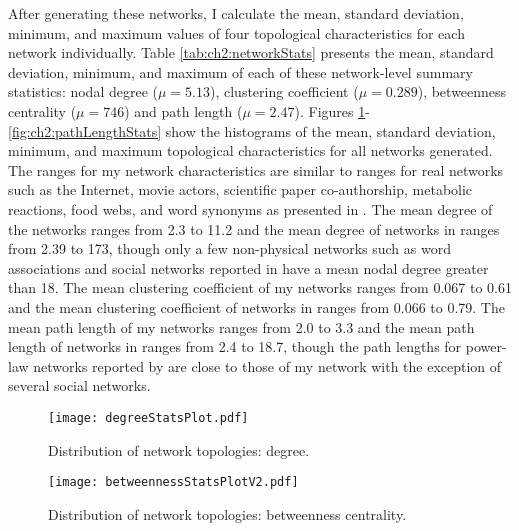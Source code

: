 After generating these networks, I calculate the mean, standard deviation, minimum, and maximum values of four topological characteristics for each network individually.  Table \ref{tab:ch2:networkStats} presents the mean, standard deviation, minimum, and maximum of each of these network-level summary statistics: nodal degree ($\mu = 5.13$), clustering coefficient \cite{Watts1998} ($\mu = 0.289$), betweenness centrality \cite{Freeman1977} ($\mu = 746$) and path length ($\mu = 2.47$).  Figures \ref{fig:ch2:degreeStats}-\ref{fig:ch2:pathLengthStats} show the histograms of the mean, standard deviation, minimum, and maximum topological characteristics for all networks generated. The ranges for my network characteristics are similar to ranges for real networks such as the Internet, movie actors, scientific paper co-authorship, metabolic reactions, food webs, and word synonyms as presented in \cite{Albert2002}. The mean degree of the networks ranges from 2.3 to 11.2 and the mean degree of networks in \cite{Albert2002} ranges from 2.39 to 173, though only a few non-physical networks such as word associations and social networks reported in \cite{Albert2002} have a mean nodal degree greater than 18. The mean clustering coefficient of my networks ranges from 0.067 to 0.61 and the mean clustering coefficient of networks in \cite{Albert2002} ranges from 0.066 to 0.79. The mean path length of my networks ranges from 2.0 to 3.3 and the mean path length of networks in \cite{Albert2002} ranges from 2.4 to 18.7, though the path lengths for power-law networks reported by \cite{Albert2002} are close to those of my network with the exception of several social networks.


\begin{figure}[!htp]
\centering
\centerline{\texttt{[image: degreeStatsPlot.pdf]}}
\caption{\label{fig:ch2:degreeStats}Distribution of network topologies: degree.}
\end{figure}



\begin{figure}[!htp]
\centering
\centerline{\texttt{[image: betweennessStatsPlotV2.pdf]}}
\caption{\label{fig:ch2:betweennessStats}Distribution of network topologies: betweenness centrality.}
\end{figure}

